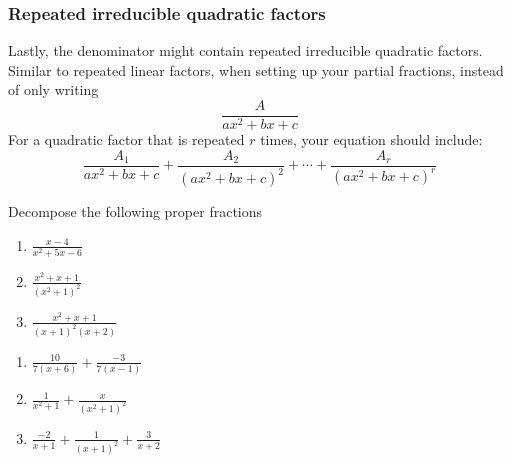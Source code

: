 \subsubsection{Repeated irreducible quadratic factors}
Lastly, the denominator might contain repeated irreducible quadratic factors. 
Similar to repeated linear factors, when setting up your partial fractions, 
instead of only writing 
$$\frac{A}{ax^2 + bx + c}$$
For a quadratic factor that is repeated $r$ times, your equation should include:
$$\frac{A_1}{ax^2 + bx + c} + \frac{A_2}{(ax^2 + bx + c)^2} + \cdots + 
\frac{A_r}{(ax^2 + bx + c)^r}$$

\begin{Exercise}[label = proper]
Decompose the following proper fractions
\begin{enumerate}
\item $\frac{x - 4}{x^2 + 5x - 6}$
\item $\frac{x^2 + x + 1}{(x^2 + 1)^2}$
\item $\frac{x^2 + x + 1}{(x + 1)^2 (x + 2)}$
\end{enumerate}
\end{Exercise}

\begin{Answer}[ref = proper]
\begin{enumerate}
\item $\frac{10}{7(x + 6)} + \frac{-3}{7(x - 1)}$
\item $\frac{1}{x^2 + 1} + \frac{x}{(x^2 + 1)^2}$
\item $\frac{-2}{x + 1} + \frac{1}{(x + 1)^2} + \frac{3}{x + 2}$
\end{enumerate}
\end{Answer}